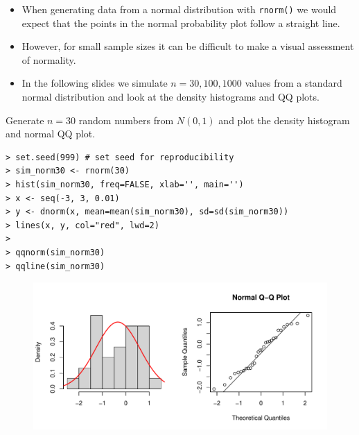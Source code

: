 \documentclass[10pt]{beamer}
\begin{document}
\begin{frame}
\begin{itemize}
\item When generating data from a normal distribution with \texttt{rnorm()} we would expect that the points in the normal probability plot follow a straight line.  \medskip
\item However, for small sample sizes it can be difficult to make a visual assessment of normality.  
 \medskip
\item In the following slides we simulate $n=30,100,1000$ values from a standard normal distribution and look at the density histograms and QQ plots. 
\end{itemize}
\end{frame}

\begin{frame}[fragile]
Generate $n=30$ random numbers from $N(0,1)$ and plot the density histogram and normal QQ plot.

\scriptsize
\begin{verbatim}
> set.seed(999) # set seed for reproducibility
> sim_norm30 <- rnorm(30)
> hist(sim_norm30, freq=FALSE, xlab='', main='')
> x <- seq(-3, 3, 0.01)
> y <- dnorm(x, mean=mean(sim_norm30), sd=sd(sim_norm30))
> lines(x, y, col="red", lwd=2)
> 
> qqnorm(sim_norm30)
> qqline(sim_norm30)
\end{verbatim}

\begin{figure}[htbp]
\centering
\includegraphics[scale=0.5]{figure/simnorm30.pdf}
\end{figure}
\end{frame}
\end{document}
